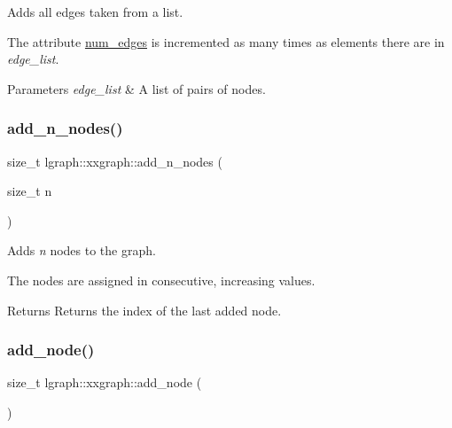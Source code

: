 Adds all edges taken from a list. 

The attribute \hyperlink{classlgraph_1_1xxgraph_a6765a9a3be42f6e0f824635c593b35d7}{num\+\_\+edges} is incremented as many times as elements there are in {\itshape edge\+\_\+list}.


\begin{DoxyParams}{Parameters}
{\em edge\+\_\+list} & A list of pairs of nodes. \\
\hline
\end{DoxyParams}
\mbox{\label{classlgraph_1_1xxgraph_a8dd24aa48d55dfceaa87e47c32ae914a}} 
\subsubsection{\texorpdfstring{add\+\_\+n\+\_\+nodes()}{add\_n\_nodes()}}
{\footnotesize\ttfamily size\+\_\+t lgraph\+::xxgraph\+::add\+\_\+n\+\_\+nodes (\begin{DoxyParamCaption}\item[{size\+\_\+t}]{n }\end{DoxyParamCaption})\hspace{0.3cm}{\ttfamily [inherited]}}



Adds {\itshape n} nodes to the graph. 

The nodes are assigned in consecutive, increasing values. \begin{DoxyReturn}{Returns}
Returns the index of the last added node. 
\end{DoxyReturn}
\mbox{\label{classlgraph_1_1xxgraph_a6cb21d5e52afbb438a3e6643998c40cf}} 
\subsubsection{\texorpdfstring{add\+\_\+node()}{add\_node()}}
{\footnotesize\ttfamily size\+\_\+t lgraph\+::xxgraph\+::add\+\_\+node (\begin{DoxyParamCaption}{ }\end{DoxyParamCaption})\hspace{0.3cm}{\ttfamily [inherited]}}



